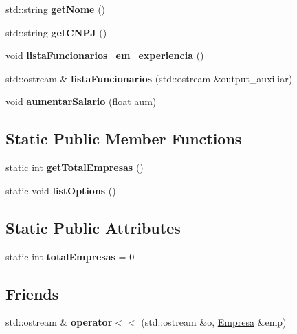 \begin{DoxyCompactItemize}
\item 
\mbox{\label{classEmpresa_a1e14e38c8d7faa8361b5bf9326aeff24}} 
std\+::string {\bfseries get\+Nome} ()
\item 
\mbox{\label{classEmpresa_a58e38db6319a94d66d5e2709c01ebea3}} 
std\+::string {\bfseries get\+C\+N\+PJ} ()
\item 
\mbox{\label{classEmpresa_a2181d72d4b2b20ee1a15be6600a00a8f}} 
void {\bfseries lista\+Funcionarios\+\_\+em\+\_\+experiencia} ()
\item 
\mbox{\label{classEmpresa_a91a31064935ca78dea6a7e6af4f0b02f}} 
std\+::ostream \& {\bfseries lista\+Funcionarios} (std\+::ostream \&output\+\_\+auxiliar)
\item 
\mbox{\label{classEmpresa_a06270a8a581998e75e4660e9141a6130}} 
void {\bfseries aumentar\+Salario} (float aum)
\end{DoxyCompactItemize}
\subsection*{Static Public Member Functions}
\begin{DoxyCompactItemize}
\item 
\mbox{\label{classEmpresa_a72ddcb1853185ad8b4c2c236d45d71f8}} 
static int {\bfseries get\+Total\+Empresas} ()
\item 
\mbox{\label{classEmpresa_abbfdf5b331b159abf7e33a68d385c626}} 
static void {\bfseries list\+Options} ()
\end{DoxyCompactItemize}
\subsection*{Static Public Attributes}
\begin{DoxyCompactItemize}
\item 
\mbox{\label{classEmpresa_ad6f81c56426d49e897cb42a0d684dc49}} 
static int {\bfseries total\+Empresas} = 0
\end{DoxyCompactItemize}
\subsection*{Friends}
\begin{DoxyCompactItemize}
\item 
\mbox{\label{classEmpresa_a23e0f32d27be57939085210b3d6f9251}} 
std\+::ostream \& {\bfseries operator$<$$<$} (std\+::ostream \&o, \hyperlink{classEmpresa}{Empresa} \&emp)
\end{DoxyCompactItemize}


